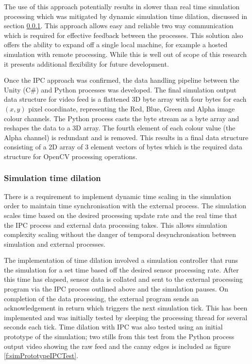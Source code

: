\documentclass[]{aiaa-tc}%
\begin{document}
 The use of this approach potentially results in slower than real time simulation processing which was mitigated by dynamic simulation time dilation, discussed in section \ref{sect:timedilation}. This approach allows easy and reliable two way communication which is required for effective feedback between the processes. This solution also offers the ability to expand off a single local machine, for example a hosted simulation with remote processing. While this is well out of scope of this research it presents additional flexibility for future development.

Once the IPC approach was confirmed, the data handling pipeline between the Unity (C\#) and Python processes was developed. The final simulation output data structure for video feed is a flattened 3D byte array with four bytes for each $(x,y)$ pixel coordinate, representing the Red, Blue, Green and Alpha image colour channels. The Python process casts the byte stream as a byte array and reshapes the data to a 3D array. The fourth element of each colour value (the Alpha channel) is redundant and is removed. This results in a final data structure consisting of a 2D array of 3 element vectors of bytes which is the required data structure for OpenCV processing operations. 

\subsubsection{Simulation time dilation}\label{sect:timedilation}

There is a requirement to implement dynamic time scaling in the simulation order to maintain time synchronisation with the external process. The simulation scales time based on the desired processing update rate and the real time that the IPC process and external data processing takes. This allows simulation complexity scaling without the danger of temporal desynchronisation between simulation and external processes.

The implementation of time dilation involved a simulation controller that runs the simulation for a set time based off the desired sensor processing rate. After this time has elapsed, sensor data is collated and sent to the external processing program via the IPC process outlined above and the simulation pauses. On completion of the data processing, the external program sends an acknowledgement in return which triggers the next simulation tick. This has been implemented and was initially tested by sleeping the processing thread for several seconds each tick. Time dilation with IPC was also tested using an initial prototype of the simulation; two stills from this test from the Python process output video showing the raw feed and the canny edges is included as figure \ref{f:simPrototypeIPCTest}.
\end{document}

